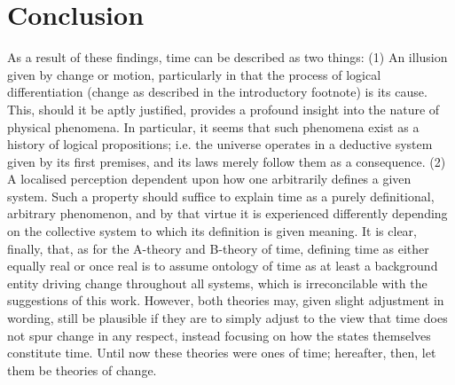 \documentclass{article}
\begin{document}
\section{Conclusion}
As a result of these findings, time can be described as two things: (1) An illusion given by change or motion, particularly in that the process of logical differentiation (change as described in the introductory footnote) is its cause. This, should it be aptly justified, provides a profound insight into the nature of physical phenomena. In particular, it seems that such phenomena exist as a history of logical propositions; i.e. the universe operates in a deductive system given by its first premises, and its laws merely follow them as a consequence. (2) A localised perception dependent upon how one arbitrarily defines a given system. Such a property should suffice to explain time as a purely definitional, arbitrary phenomenon, and by that virtue it is experienced differently depending on the collective system to which its definition is given meaning. It is clear, finally, that, as for the A-theory and B-theory of time, defining time as either equally real or once real is to assume ontology of time as at least a background entity driving change throughout all systems, which is irreconcilable with the suggestions of this work. However, both theories may, given slight adjustment in wording, still be plausible if they are to simply adjust to the view that time does not spur change in any respect, instead focusing on how the states themselves constitute time. Until now these theories were ones of time; hereafter, then, let them be theories of change.
\end{document}
